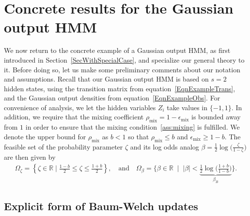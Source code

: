 \documentclass[twoside,11pt]{article}
\newcommand{\nstates}{s}
\newcommand{\mixcoef}{\ensuremath{\rho_{\mathrm{mix}}}}
\newcommand{\mixcoefeps}{\ensuremath{\epsilon_{\mathrm{mix}}}}
\newcommand{\mixcoefbound}{\ensuremath{b}}
\newcommand{\paramtransbound}{\ensuremath{\beta_B}}
\newcommand{\paramtrans}{\beta}
\newcommand{\paramspacetrans}{\ensuremath{\Omega_\paramtrans}}
\newcommand{\paramspacep}{\ensuremath{\Omega_\matprob}}
\newcommand{\real}{\ensuremath{\mathbb{R}}}
\newcommand{\probpar}{\zeta}
\newcommand{\matprob}{\probpar}
\begin{document}

\section{Concrete results for the Gaussian output HMM}
\label{sec:normal_HMM}

We now return to the concrete example of a Gaussian output HMM, as
first introduced in Section~\ref{SecWithSpecialCase}, and specialize
our general theory to it.  Before doing so, let us make some
preliminary comments about our notation and assumptions.  Recall that
our Gaussian output HMM is based on $\nstates = 2$ hidden states,
using the transition matrix from equation~\eqref{EqnExampleTrans}, and
the Gaussian output densities from equation~\eqref{EqnExampleObs}.
For convenience of analysis, we let the hidden variables $Z_i$ take
values in $\{-1,1\}$. In addition, we require that the mixing
coefficient $\mixcoef = 1- \mixcoefeps$ is bounded away from $1$ in
order to ensure that the mixing condition~\eqref{ass:mixing} is
fulfilled.  We denote the upper bound for $\mixcoef$ as
$\mixcoefbound<1$ so that $\mixcoef \leq \mixcoefbound$ and $
\mixcoefeps \geq 1 - \mixcoefbound$.  The feasible set of the
probability parameter $\probpar$ and its log odds analog $\paramtrans
= \frac{1}{2} \log \big(\frac{\probpar}{1-\probpar} \big)$ are then
given by
\begin{align}
\label{eqn:probset} 
\paramspacep = \left\{\probpar \in \real \mid
\frac{1-\mixcoefbound}{2} \leq \probpar \leq \frac{1+\mixcoefbound}{2}
\right\}, \quad \mbox{and} \quad \paramspacetrans = \Big \{\paramtrans
\in \real \; \mid \; |\paramtrans| < \underbrace{\frac{1}{2} \log
  \big( \frac{1 + \mixcoefbound}{1 - \mixcoefbound}
  \big)}_{\paramtransbound} \Big\}.
\end{align}


\subsection{Explicit form of Baum-Welch updates}
\end{document}
